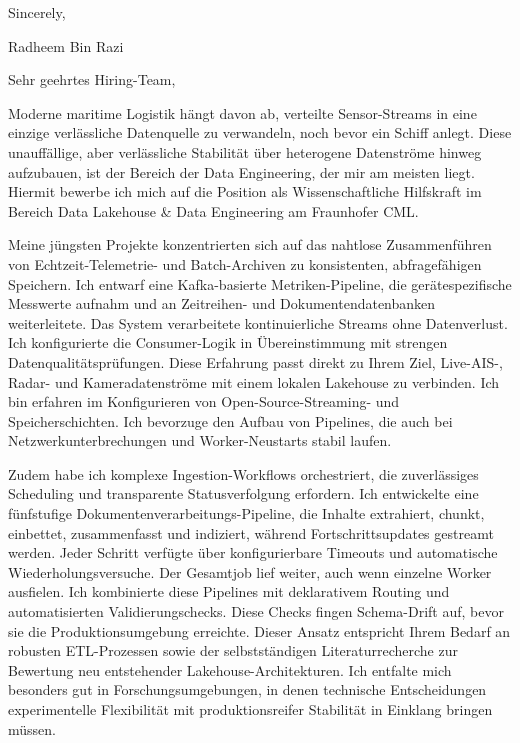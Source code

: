 \documentclass[11pt,a4paper]{coverletter}
\begin{document}
\closing{Sincerely,}{Radheem Bin Razi}

\clearpage
{}


\opening{Sehr geehrtes Hiring-Team,}

Moderne maritime Logistik hängt davon ab, verteilte Sensor-Streams in eine einzige verlässliche Datenquelle zu verwandeln, noch bevor ein Schiff anlegt. Diese unauffällige, aber verlässliche Stabilität über heterogene Datenströme hinweg aufzubauen, ist der Bereich der Data Engineering, der mir am meisten liegt. Hiermit bewerbe ich mich auf die Position als Wissenschaftliche Hilfskraft im Bereich Data Lakehouse \& Data Engineering am Fraunhofer CML.

Meine jüngsten Projekte konzentrierten sich auf das nahtlose Zusammenführen von Echtzeit-Telemetrie- und Batch-Archiven zu konsistenten, abfragefähigen Speichern. Ich entwarf eine Kafka-basierte Metriken-Pipeline, die gerätespezifische Messwerte aufnahm und an Zeitreihen- und Dokumentendatenbanken weiterleitete. Das System verarbeitete kontinuierliche Streams ohne Datenverlust. Ich konfigurierte die Consumer-Logik in Übereinstimmung mit strengen Datenqualitätsprüfungen. Diese Erfahrung passt direkt zu Ihrem Ziel, Live-AIS-, Radar- und Kameradatenströme mit einem lokalen Lakehouse zu verbinden. Ich bin erfahren im Konfigurieren von Open-Source-Streaming- und Speicherschichten. Ich bevorzuge den Aufbau von Pipelines, die auch bei Netzwerkunterbrechungen und Worker-Neustarts stabil laufen.

Zudem habe ich komplexe Ingestion-Workflows orchestriert, die zuverlässiges Scheduling und transparente Statusverfolgung erfordern. Ich entwickelte eine fünfstufige Dokumentenverarbeitungs-Pipeline, die Inhalte extrahiert, chunkt, einbettet, zusammenfasst und indiziert, während Fortschrittsupdates gestreamt werden. Jeder Schritt verfügte über konfigurierbare Timeouts und automatische Wiederholungsversuche. Der Gesamtjob lief weiter, auch wenn einzelne Worker ausfielen. Ich kombinierte diese Pipelines mit deklarativem Routing und automatisierten Validierungschecks. Diese Checks fingen Schema-Drift auf, bevor sie die Produktionsumgebung erreichte. Dieser Ansatz entspricht Ihrem Bedarf an robusten ETL-Prozessen sowie der selbstständigen Literaturrecherche zur Bewertung neu entstehender Lakehouse-Architekturen. Ich entfalte mich besonders gut in Forschungsumgebungen, in denen technische Entscheidungen experimentelle Flexibilität mit produktionsreifer Stabilität in Einklang bringen müssen.
\end{document}
